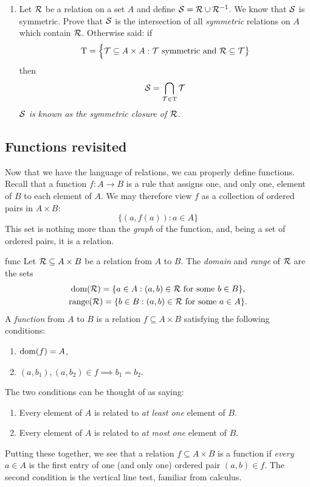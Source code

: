\begin{exercises}{}{}
\begin{enumerate}
  \item Let $\mathcal{R}$ be a relation on a set $A$ and define $\mathcal{S}=\mathcal{R}\cup\mathcal{R}^{-1}$. We know that $\mathcal{S}$ is symmetric. Prove that $\mathcal{S}$ is the intersection of all \emph{symmetric} relations on $A$ which contain $\mathcal{R}$. Otherwise said: if
  \[\mathrm T=\Bigl\{\mathcal T\subseteq A\times A:\mathcal T\text{ symmetric and }\mathcal{R}\subseteq\mathcal T\bigr\}\]
  then
  \[\mathcal{S}=\bigcap\limits_{\mathcal T\in \mathrm T} \mathcal T\]
  \emph{$\mathcal{S}$ is known as the \emph{symmetric closure} of $\mathcal{R}$.}
\end{enumerate}

\end{exercises}

\clearpage


\subsection{Functions revisited}\label{sec:func2}

Now that we have the language of relations, we can properly define functions. Recall that a function $f:A\to B$ is a rule that assigns one, and only one, element of $B$ to each element of $A$. We may therefore view $f$ as a collection of ordered pairs in $A\times B$:
\[
	\big\{(a,f(a)):a\in A\big\}
\]
This set is nothing more than the \emph{graph} of the function, and, being a set of ordered pairs, it is a relation.

\begin{defn}{}{func}
	Let $\mathcal{R}\subseteq A\times B$ be a relation from $A$ to $B$. The \emph{domain} and \emph{range} of $\mathcal{R}$ are the sets
	\begin{gather*}
		\operatorname{dom}(\mathcal{R})=\{a\in A:(a,b)\in \mathcal{R}\text{ for some }b\in B\},\\
		\operatorname{range}(\mathcal{R})=\{b\in B:(a,b)\in \mathcal{R}\text{ for some }a\in A\}.
	\end{gather*}
	A \emph{function} from $A$ to $B$ is a relation $f\subseteq A\times B$ satisfying the following conditions:
	\begin{enumerate}
	  \item $\operatorname{dom}(f)=A$,
	  \item $(a,b_1),(a,b_2)\in f\implies b_1=b_2$.
	\end{enumerate}
\end{defn}

The two conditions can be thought of as saying:
\begin{enumerate}
  \item Every element of $A$ is related to \emph{at least one} element of $B$.
  \item Every element of $A$ is related to \emph{at most one} element of $B$.
\end{enumerate}
Putting these together, we see that a relation $f\subseteq A\times B$ is a function if \emph{every} $a\in A$ is the first entry of one (and only one) ordered pair $(a,b)\in f$. The second condition is the vertical line test, familiar from calculus.

